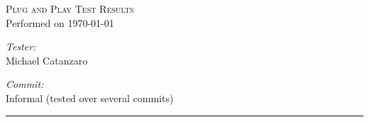 \documentclass{article}
\newcommand{\testerName}{Michael Catanzaro}
\newcommand{\commitHash}{Informal (tested over several commits)}
\begin{document}
\begin{titlepage}
\begin{center}
\textsc{\huge Plug and Play Test Results} \\ [0.25cm]
\Large Performed on \today \\ [0.5cm]

\begin{minipage}[t]{0.4\textwidth}
\large \emph{Tester:} \\ \testerName
\end{minipage}
\begin{minipage}[t]{0.4\textwidth}
\raggedleft\large\emph{Commit:} \\ \commitHash
\end{minipage}

\vspace{0.5cm}\hrule

\end{center}
\end{titlepage}
\end{document}
